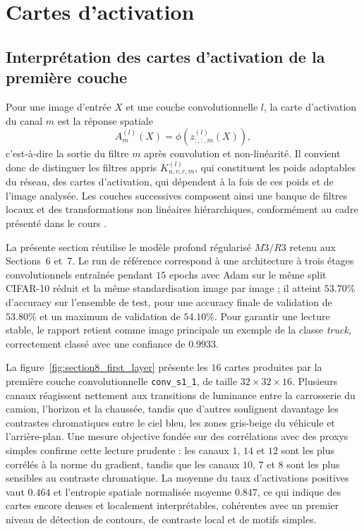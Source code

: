 \section{Cartes d'activation}

\subsection{Interpr\'etation des cartes d'activation de la premi\`ere couche}
Pour une image d'entr\'ee $X$ et une couche convolutionnelle $l$, la carte d'activation du canal $m$ est la r\'eponse spatiale
\begin{equation}
A_m^{(l)}(X)=\phi\!\left(z^{(l)}_{:,:,m}(X)\right),
\end{equation}
c'est-\`a-dire la sortie du filtre $m$ apr\`es convolution et non-lin\'earit\'e. Il convient donc de distinguer les filtres appris $K^{(l)}_{u,v,c,m}$, qui constituent les poids adaptables du r\'eseau, des cartes d'activation, qui d\'ependent \`a la fois de ces poids et de l'image analys\'ee. Les couches successives composent ainsi une banque de filtres locaux et des transformations non lin\'eaires hi\'erarchiques, conform\'ement au cadre pr\'esent\'e dans le cours \cite{lecun_convolutional_networks,manzanera_classification_apprentissage,poly_chap4_classifml}.

La pr\'esente section r\'eutilise le mod\`ele profond r\'egularis\'e $M3/R3$ retenu aux Sections~6 et~7. Le run de r\'ef\'erence correspond \`a une architecture \`a trois \'etages convolutionnels entra\^in\'ee pendant $15$ epochs avec Adam sur le m\^eme split CIFAR-10 r\'eduit et la m\^eme standardisation image par image ; il atteint $53.70\%$ d'accuracy sur l'ensemble de test, pour une accuracy finale de validation de $53.80\%$ et un maximum de validation de $54.10\%$. Pour garantir une lecture stable, le rapport retient comme image principale un exemple de la classe \textit{truck}, correctement class\'e avec une confiance de $0.9933$.

La figure~\ref{fig:section8_first_layer} pr\'esente les $16$ cartes produites par la premi\`ere couche convolutionnelle \texttt{conv\_s1\_1}, de taille $32\times 32\times 16$. Plusieurs canaux r\'eagissent nettement aux transitions de luminance entre la carrosserie du camion, l'horizon et la chauss\'ee, tandis que d'autres soulignent davantage les contrastes chromatiques entre le ciel bleu, les zones gris-beige du v\'ehicule et l'arri\`ere-plan. Une mesure objective fond\'ee sur des corr\'elations avec des proxys simples confirme cette lecture prudente : les canaux $1$, $14$ et $12$ sont les plus corr\'el\'es \`a la norme du gradient, tandis que les canaux $10$, $7$ et $8$ sont les plus sensibles au contraste chromatique. La moyenne du taux d'activations positives vaut $0.464$ et l'entropie spatiale normalis\'ee moyenne $0.847$, ce qui indique des cartes encore denses et localement interpr\'etables, coh\'erentes avec un premier niveau de d\'etection de contours, de contraste local et de motifs simples.

